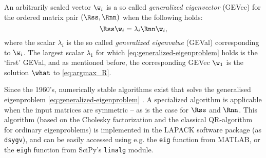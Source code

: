 An arbitrarily scaled vector $\w_i$ is a so called \emph{generalized eigenvector} (GEVec) for the ordered matrix pair $(\Rss, \Rnn)$ when the following holds:
%
\begin{equation}
\label{eq:generalized-eigenproblem}
\Rss \w_i = \lambda_i \Rnn \w_i,
\end{equation}
%
where the scalar $\lambda_i$ is the so called \emph{generalized eigenvalue} (GEVal) corresponding to $\w_i$. The largest scalar $\lambda_1$ for which \cref{eq:generalized-eigenproblem} holds is the `first' GEVal, and as mentioned before, the corresponding GEVec $\w_1$ is the solution $\what$ to \cref{eq:argmax_R}.

Since the 1960's, numerically stable algorithms exist that solve the generalised eigenproblem \cref{eq:generalized-eigenproblem} \cite{Golub2013}. A specialized algorithm is applicable when the input matrices are symmetric -- as is the case for $\Rss$ and $\Rnn$. This algorithm (based on the Cholesky factorization and the classical QR-algorithm for ordinary eigenproblems) is implemented in the LAPACK software package (as \texttt{dsygv}), and can be easily accessed using e.g. the \texttt{eig} function from MATLAB, or the \texttt{eigh} function from SciPy's \texttt{linalg} module.


\begin{figure}
\end{figure}
